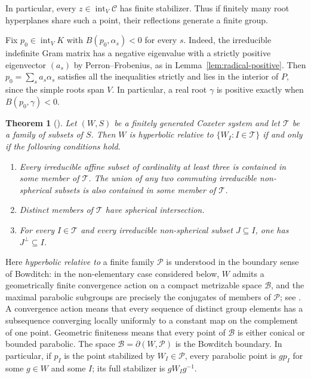 \documentclass[11pt,reqno]{amsart}
\theoremstyle{plain}
\newtheorem{theorem}{Theorem}[section]
\theoremstyle{definition}
\theoremstyle{remark}
\numberwithin{equation}{section}
\begin{document}
In particular, every $z\in\operatorname{int}_V\mathcal C$ has finite
stabilizer. Thus if finitely many root hyperplanes share such a point,
their reflections generate a finite group.

Fix $p_0\in\operatorname{int}_V K$ with $B(p_0,\alpha_s)<0$ for every
$s$. Indeed, the irreducible indefinite Gram matrix has a negative
eigenvalue with a strictly positive eigenvector $(a_s)$ by
Perron--Frobenius, as in Lemma~\ref{lem:radical-positive}. Then
$p_0=\sum_s a_s\alpha_s$ satisfies all the inequalities strictly and
lies in the interior of $P$, since the simple roots span $V$.
In particular, a real root $\gamma$ is positive exactly when
$B(p_0,\gamma)<0$.

\begin{theorem}[{\cite[Theorem~A$'$]{CapraceErratum}}]\label{thm:caprace-relative}
Let $(W,S)$ be a finitely generated Coxeter system and let $\mathcal T$ be a family of subsets of $S$.
Then $W$ is hyperbolic relative to $\{W_I:I\in\mathcal T\}$ if and only if the following conditions hold.
\begin{enumerate}[label=\textup{(RH\arabic*)}]
    \item Every irreducible affine subset of cardinality at least three is contained in some member of $\mathcal T$. The union of any two commuting irreducible non-spherical subsets is also contained in some member of $\mathcal T$.
    \item Distinct members of $\mathcal T$ have spherical intersection.
    \item For every $I\in\mathcal T$ and every irreducible non-spherical subset $J\subseteq I$, one has $J^\perp\subseteq I$.
\end{enumerate}
\end{theorem}

\noindent
Here \emph{hyperbolic relative to} a finite family $\mathcal P$
is understood in the boundary sense of Bowditch: in the non-elementary
case considered below, $W$ admits a geometrically finite convergence
action on a compact metrizable space $\mathcal B$, and the maximal
parabolic subgroups are precisely the conjugates of members of
$\mathcal P$; see \cite{Bowditch}.
A convergence action means that every sequence of distinct group
elements has a subsequence converging locally uniformly to a constant
map on the complement of one point.
Geometric finiteness means that every point of $\mathcal B$ is either
conical or bounded parabolic.
The space $\mathcal B=\partial(W,\mathcal P)$ is the Bowditch boundary.
In particular, if $p_I$ is the point stabilized by $W_I\in\mathcal P$,
every parabolic point is $g p_I$ for some $g\in W$ and some $I$;
its full stabilizer is $gW_Ig^{-1}$.
\end{document}
